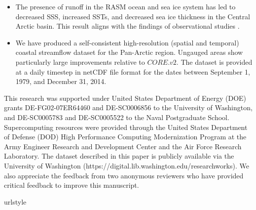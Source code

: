 \documentclass[jgrga, draft]{agutex}
\begin{document}
\begin{article}
\begin{itemize}[leftmargin=+.5in]
  \item The presence of runoff in the RASM ocean and sea ice system has led to decreased SSS, increased SSTs, and decreased sea ice thickness in the Central Arctic basin.
  This result aligns with the findings of observational studies \citep[e.g.][]{Morison_2012}.
  \item We have produced a self-consistent high-resolution (spatial and temporal) coastal streamflow dataset for the Pan-Arctic region.
  Ungauged areas show particularly large improvements relative to $CORE.v2$.
  The dataset is provided at a daily timestep in netCDF file format for the dates between September 1, 1979, and December 31, 2014.
\end{itemize}


%
%
%


\begin{acknowledgments}
This research was supported under United States Department of Energy (DOE) grants DE-FG02-07ER64460 and DE-SC0006856 to the University of Washington, and DE-SC0005783 and DE-SC0005522 to the Naval Postgraduate School.
Supercomputing resources were provided through the United States Department of Defense (DOD) High Performance Computing Modernization Program at the Army Engineer Research and Development Center and the Air Force Research Laboratory.
The dataset described in this paper is publicly available via the University of Washington (https://digital.lib.washington.edu/researchworks).
We also appreciate the feedback from two anonymous reviewers who have provided critical feedback to improve this manuscript.
\end{acknowledgments}


% 
% 
\begin{thebibliography}{79}
\providecommand{\natexlab}[1]{#1}
\expandafter\ifx\csname urlstyle\endcsname\relax
  \providecommand{\doi}[1]{doi:\discretionary{}{}{}#1}\else
  \providecommand{\doi}{doi:\discretionary{}{}{}\begingroup
  \urlstyle{rm}\Url}\fi


\end{thebibliography}
\end{article}
\end{document}
